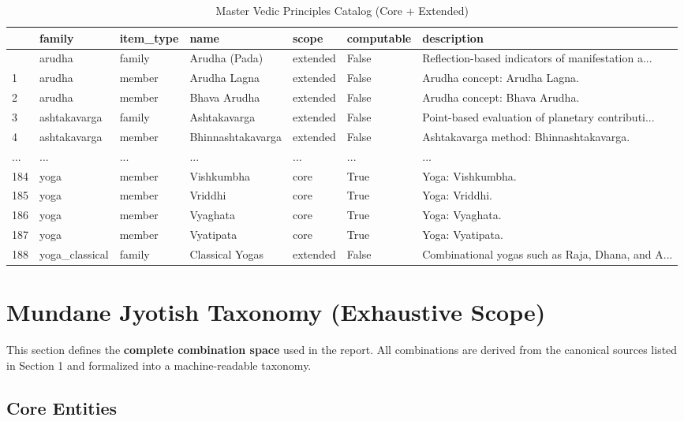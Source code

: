 \documentclass[
  11pt,
  a4paper,
  oneside,
  openany]{article}
\begin{document}
\begin{longtable}[]{@{}lllllll@{}}

\caption{\label{tbl-eq-vedic-master}Master Vedic Principles Catalog
(Core + Extended)}

\tabularnewline

\toprule\noalign{}
& family & item\_type & name & scope & computable & description \\
\midrule\noalign{}
\endhead
\bottomrule\noalign{}
\endlastfoot
0 & arudha & family & Arudha (Pada) & extended & False &
Reflection-based indicators of manifestation a... \\
1 & arudha & member & Arudha Lagna & extended & False & Arudha concept:
Arudha Lagna. \\
2 & arudha & member & Bhava Arudha & extended & False & Arudha concept:
Bhava Arudha. \\
3 & ashtakavarga & family & Ashtakavarga & extended & False &
Point-based evaluation of planetary contributi... \\
4 & ashtakavarga & member & Bhinnashtakavarga & extended & False &
Ashtakavarga method: Bhinnashtakavarga. \\
... & ... & ... & ... & ... & ... & ... \\
184 & yoga & member & Vishkumbha & core & True & Yoga: Vishkumbha. \\
185 & yoga & member & Vriddhi & core & True & Yoga: Vriddhi. \\
186 & yoga & member & Vyaghata & core & True & Yoga: Vyaghata. \\
187 & yoga & member & Vyatipata & core & True & Yoga: Vyatipata. \\
188 & yoga\_classical & family & Classical Yogas & extended & False &
Combinational yogas such as Raja, Dhana, and A... \\

\end{longtable}

\section{Mundane Jyotish Taxonomy (Exhaustive
Scope)}\label{mundane-jyotish-taxonomy-exhaustive-scope}

This section defines the \textbf{complete combination space} used in the
report. All combinations are derived from the canonical sources listed
in Section 1 and formalized into a machine-readable taxonomy.

\subsection{Core Entities}\label{core-entities}
\end{document}
